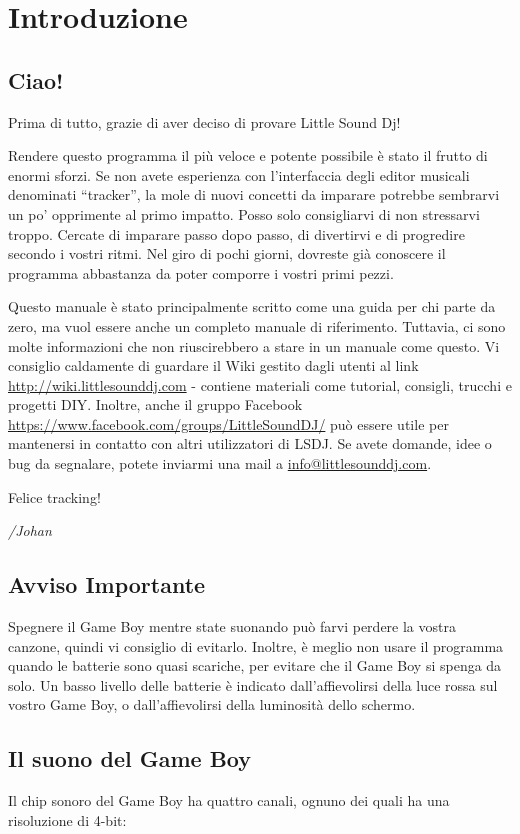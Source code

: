 \chapter{Introduzione}
\section{Ciao!}
Prima di tutto, grazie di aver deciso di provare Little Sound Dj!

Rendere questo programma il più veloce e potente possibile è stato il frutto di enormi sforzi.
Se non avete esperienza con l’interfaccia degli editor musicali denominati “tracker”, la mole di nuovi concetti da imparare potrebbe sembrarvi un po’ opprimente al primo impatto. Posso solo consigliarvi di non stressarvi troppo. Cercate di imparare passo dopo passo, di divertirvi e di progredire secondo i vostri ritmi. 
Nel giro di pochi giorni, dovreste già conoscere il programma abbastanza da poter comporre i vostri primi pezzi. 

Questo manuale è stato principalmente scritto come una guida per chi parte da zero, ma vuol essere anche un completo manuale di riferimento. Tuttavia, ci sono molte informazioni che non riuscirebbero a stare in un manuale come questo. Vi consiglio caldamente di guardare il Wiki gestito dagli utenti al link \url{http://wiki.littlesounddj.com} - contiene materiali come tutorial, consigli, trucchi e progetti DIY. Inoltre, anche il gruppo Facebook \url{https://www.facebook.com/groups/LittleSoundDJ/} può essere utile per mantenersi in contatto con altri utilizzatori di LSDJ.
Se avete domande, idee o bug da segnalare, potete inviarmi una mail a \href{mailto:info@littlesounddj.com}{info@littlesounddj.com}.

Felice tracking!

\textit{/Johan}

\section{Avviso Importante}

Spegnere il Game Boy mentre state suonando può farvi perdere la vostra canzone, quindi vi consiglio di evitarlo.
Inoltre, è meglio non usare il programma quando le batterie sono quasi scariche, per evitare che il Game Boy si spenga da solo.
Un basso livello delle batterie è indicato dall'affievolirsi della luce rossa sul vostro Game Boy, o dall'affievolirsi della luminosità dello schermo.

\section{Il suono del Game Boy}
Il chip sonoro del Game Boy ha quattro canali, ognuno dei quali ha una risoluzione di 4-bit:

